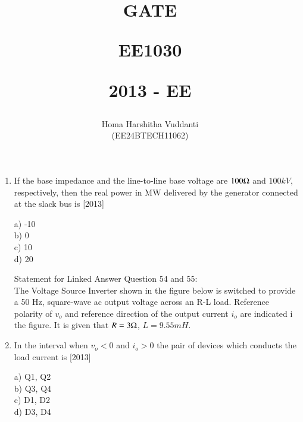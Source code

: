 \documentclass[journal]{IEEEtran}
\begin{document}


\title{
GATE

\large{EE1030}

2013 - EE
}
\author{Homa Harshitha Vuddanti

(EE24BTECH11062)
}	

\maketitle

\bigskip

\renewcommand{\thefigure}{\theenumi}
\renewcommand{\thetable}{\theenumi}
\begin{enumerate}[start=53]
   
\item If the base impedance and the line-to-line base voltage are $100\ohm$ and $100kV$, respectively, then the real power in MW delivered by the generator connected at the slack bus is \hfill{[2013]}
\begin{multicols}{4}
    a) -10\\
    b) 0\\
    c) 10\\
    d)  20
\end{multicols}
Statement for Linked Answer Question 54 and 55:\\
The Voltage Source Inverter  shown in the figure below is switched to provide a 50 Hz, square-wave ac output voltage  across an R-L load. Reference polarity of $v_o$ and reference direction of the output current $i_o$ are indicated i the figure. It is given that $R=3\ohm$, $L=9.55 mH$.\\
\begin{center}
   \scalebox{0.75}{}
\end{center}

 \item In the interval when $v_o<0$ and $i_o>0$ the pair of devices which conducts the load current is \hfill{[2013]}

 \begin{multicols}{4}
     a) Q1, Q2\\
     b) Q3, Q4\\
     c) D1, D2\\
     d) D3, D4
 \end{multicols}
 

\end{enumerate}
\end{document}
